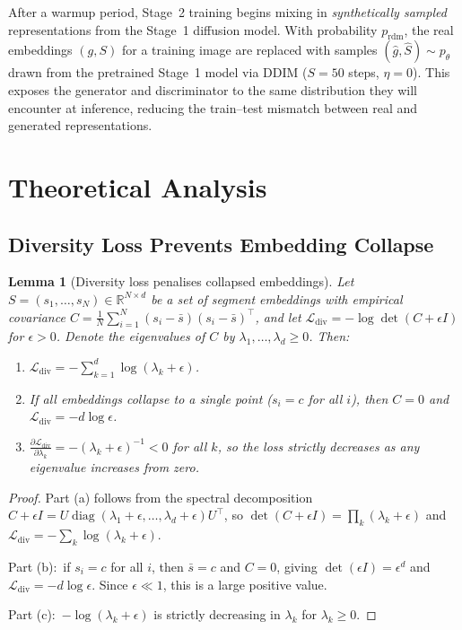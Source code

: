 \documentclass[12pt]{article}
\newtheorem{lemma}{Lemma}
\DeclareMathOperator{\diag}{diag}
\begin{document}
After a warmup period, Stage~2 training begins mixing in
\emph{synthetically sampled} representations from the Stage~1 diffusion
model.
With probability $p_{\mathrm{rdm}}$, the real embeddings $(g, S)$
for a training image are replaced with samples
$(\hat{g}, \hat{S}) \sim p_\theta$ drawn from the pretrained
Stage~1 model via DDIM ($S = 50$ steps, $\eta = 0$).
This exposes the generator and discriminator to the same distribution
they will encounter at inference, reducing the train--test mismatch
between real and generated representations.

\section{Theoretical Analysis}
\label{sec:theory}

\subsection{Diversity Loss Prevents Embedding Collapse}

\begin{lemma}[Diversity loss penalises collapsed embeddings]
\label{lem:div-collapse}
Let $S = (s_1, \ldots, s_N) \in \mathbb{R}^{N \times d}$ be a set of
segment embeddings with empirical covariance
$C = \frac{1}{N}\sum_{i=1}^{N}(s_i - \bar{s})(s_i - \bar{s})^\top$,
and let $\mathcal{L}_{\mathrm{div}} = -\log\det(C + \epsilon I)$
for $\epsilon > 0$.
Denote the eigenvalues of $C$ by $\lambda_1, \ldots, \lambda_d \geq 0$.
Then:
\begin{enumerate}
    \item[(a)] $\mathcal{L}_{\mathrm{div}} = -\sum_{k=1}^{d} \log(\lambda_k + \epsilon)$.
    \item[(b)] If all embeddings collapse to a single point
    ($s_i = c$ for all $i$), then $C = 0$ and
    $\mathcal{L}_{\mathrm{div}} = -d\log\epsilon$.
    \item[(c)] $\frac{\partial \mathcal{L}_{\mathrm{div}}}{\partial \lambda_k}
    = -(\lambda_k + \epsilon)^{-1} < 0$ for all $k$,
    so the loss strictly decreases as any eigenvalue increases from zero.
\end{enumerate}
\end{lemma}

\begin{proof}
Part (a) follows from the spectral decomposition
$C + \epsilon I = U \diag(\lambda_1 + \epsilon, \ldots, \lambda_d + \epsilon) U^\top$,
so $\det(C + \epsilon I) = \prod_{k}(\lambda_k + \epsilon)$ and
$\mathcal{L}_{\mathrm{div}} = -\sum_{k}\log(\lambda_k + \epsilon)$.

Part (b):\ if $s_i = c$ for all $i$, then $\bar{s} = c$ and $C = 0$,
giving $\det(\epsilon I) = \epsilon^d$ and
$\mathcal{L}_{\mathrm{div}} = -d\log\epsilon$.
Since $\epsilon \ll 1$, this is a large positive value.

Part (c):\ $-\log(\lambda_k + \epsilon)$ is strictly decreasing in
$\lambda_k$ for $\lambda_k \geq 0$.
\end{proof}
\end{document}
